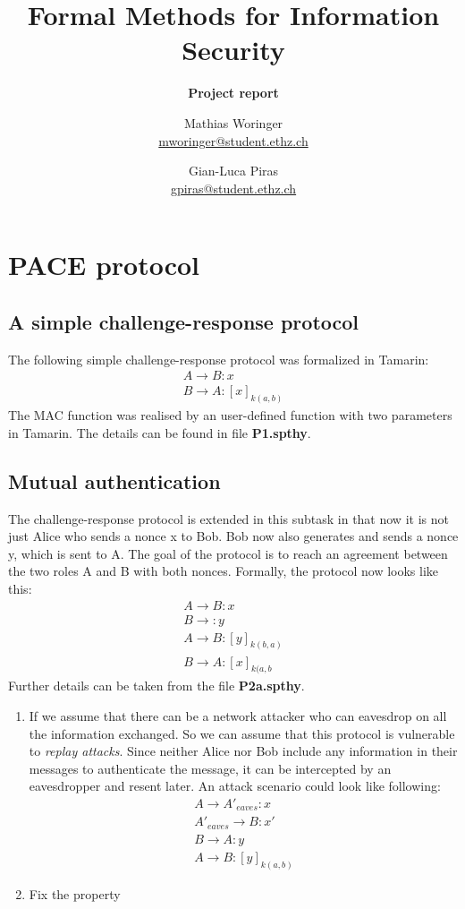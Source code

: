 \documentclass[a4paper,11pt]{scrartcl}
\title{Formal Methods for Information Security}
\author{Mathias Woringer \\ \href{mailto:mworinger@student.ethz.ch} {mworinger@student.ethz.ch}
\and Gian-Luca Piras \\ \href{mailto:gpiras@student.ethz.ch}{gpiras@student.ethz.ch}}
\subtitle{\textbf{Project report}}
\begin{document}
\maketitle

\section{PACE protocol}
\subsection{A simple challenge-response protocol}
The following simple challenge-response protocol was formalized in Tamarin:
\begin{align*}
  A \rightarrow B: x\\
  B \rightarrow A: [x]_{k(a,b)}
\end{align*}
The MAC function was realised by an user-defined function with two parameters in Tamarin.  The details can be found in file \textbf{P1.spthy}. 
\subsection{Mutual authentication}
The challenge-response protocol is extended in this subtask in that now it is not just Alice who sends a nonce x to Bob.  Bob now also generates and sends a nonce y,  which is sent to A. The goal of the protocol is to reach an agreement between the two roles A and B with both nonces. Formally, the protocol now looks like this:
\begin{align*}
A \rightarrow B: x\\
B \rightarrow: y\\
A \rightarrow B: [y]_{k(b,a)}\\
B \rightarrow A: [x]_{k(a,b}
\end{align*}
Further details can be taken from the file \textbf{P2a.spthy}.
\begin{enumerate}[label=\alph*)]
	\item If we assume that there can be a network attacker who can eavesdrop on all the information exchanged.  So we can assume that this protocol is vulnerable to \textit{
	replay attacks}. Since neither Alice nor Bob include any information in their messages to authenticate the message, it can be intercepted by an eavesdropper and resent later.
	An attack scenario could look like following:
	\begin{align*}
	A \rightarrow A'_{eaves}: x\\
	A'_{eaves} \rightarrow B: x'\\
	B \rightarrow A : y\\
	A \rightarrow B : [y]_{k(a,b)}
	\end{align*}
	\item Fix the property
\end{enumerate}
\end{document}
